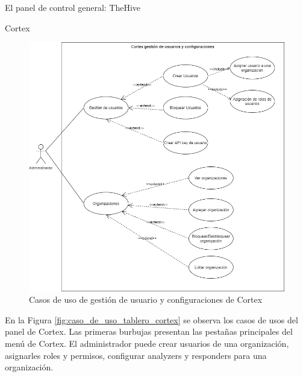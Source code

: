 \begin{section}{El panel de control general: TheHive }
\begin{subsection}{Cortex}
     \begin{figure}[H]
        \centering
        \includegraphics[width=1\textwidth]{./descripcion_sonion_imagenes/figura_30_cortex_user_conf.png}
        \caption{Casos de uso de gestión de usuario y configuraciones de Cortex}
        \label{fig:caso_de_uso_gestion_usuarios_configuraciones_cortex}
     \end{figure}
     \FloatBarrier
     En la Figura \ref{fig:caso_de_uso_tablero_cortex} se observa los casos de usos del panel de Cortex. Las primeras burbujas presentan las pestañas principales del menú de Cortex. El administrador puede crear usuarios de una organización, asignarles roles y permisos, configurar analyzers y responders para una organización.
     \begin{figure}[H]
      \centering

\end{figure}
\end{subsection}
\end{section}
